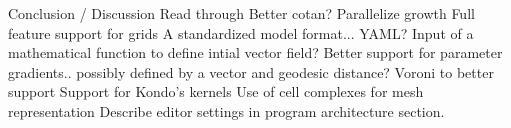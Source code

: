 Conclusion / Discussion
	Read through
	Better cotan?
	Parallelize growth
	Full feature support for grids
	A standardized model format... YAML?
	Input of a mathematical function to define intial vector field?
	Better support for parameter gradients.. possibly defined by a vector and geodesic distance?
	Voroni to better support
	Support for Kondo's kernels
	Use of cell complexes for mesh representation
	Describe editor settings in program architecture section.